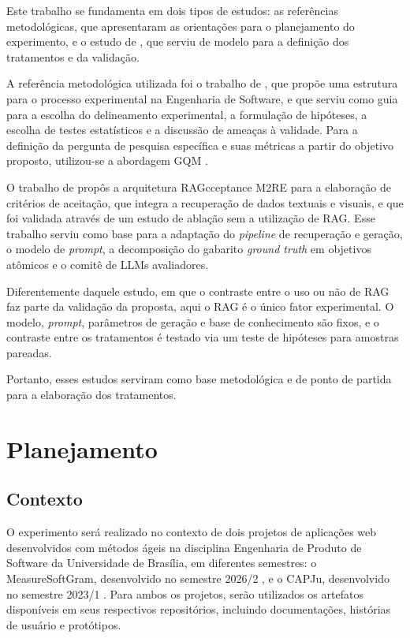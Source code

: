 Este trabalho se fundamenta em dois tipos de estudos: as referências metodológicas, que apresentaram as orientações para o planejamento do experimento, e o estudo de , que serviu de modelo para a definição dos tratamentos e da validação.

A referência metodológica utilizada foi o trabalho de , que propõe uma estrutura para o processo experimental na Engenharia de Software, e que serviu como guia para a escolha do delineamento experimental, a formulação de hipóteses, a escolha de testes estatísticos e a discussão de ameaças à validade. Para a definição da pergunta de pesquisa específica e suas métricas a partir do objetivo proposto, utilizou-se a abordagem GQM \cite{basili1994}.

O trabalho de  propôs a arquitetura RAGcceptance M2RE para a elaboração de critérios de aceitação, que integra a recuperação de dados textuais e visuais, e que foi validada através de um estudo de ablação sem a utilização de RAG. Esse trabalho serviu como base para a adaptação do  \textit{pipeline} de recuperação e geração, o modelo de \textit{prompt}, a decomposição do gabarito \textit{ground truth} em objetivos atômicos e o comitê de LLMs avaliadores.

Diferentemente daquele estudo, em que o contraste entre o uso ou não de RAG faz parte da validação da proposta, aqui o RAG é o único fator experimental. O modelo, \textit{prompt}, parâmetros de geração e base de conhecimento são fixos, e o contraste entre os tratamentos é testado via um teste de hipóteses para amostras pareadas.

Portanto, esses estudos serviram como base metodológica e de ponto de partida para a elaboração dos tratamentos.

\section{Planejamento}
\label{sec:planejamento}

\subsection{Contexto}

O experimento será realizado no contexto de dois projetos de aplicações web desenvolvidos com métodos ágeis na disciplina Engenharia de Produto de Software da Universidade de Brasília, em diferentes semestres: o MeasureSoftGram, desenvolvido no semestre 2026/2 \cite{measuresoftgram2026doc}, e o CAPJu, desenvolvido no semestre 2023/1 \cite{capju2023doc}. Para ambos os projetos, serão utilizados os artefatos disponíveis em seus respectivos repositórios, incluindo documentações, histórias de usuário e protótipos.

